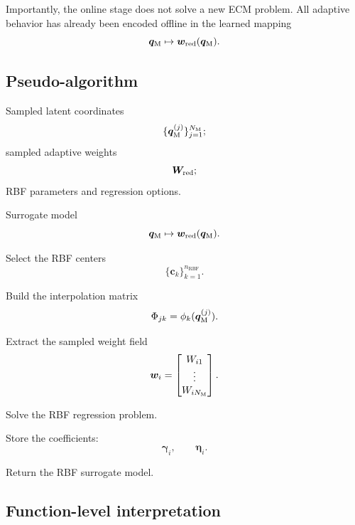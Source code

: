 \documentclass[11pt,a4paper]{article}
\begin{document}
Importantly, the online stage does not solve a new ECM problem. All adaptive
behavior has already been encoded offline in the learned mapping
\[
        \bm q_{\mathrm{M}}\mapsto\bm w_{\mathrm{red}}(\bm q_{\mathrm{M}}).
\]

\subsection{Pseudo-algorithm}

\begin{algorithm}[H]
\caption{Regression of the adaptive weight fields}
\label{alg:weight_regression}
\begin{algorithmic}[1]

\Require
Sampled latent coordinates
\[
        \{\bm q_{\mathrm{M}}^{(j)}\}_{j=1}^{N_{\mathrm{M}}};
\]
sampled adaptive weights
\[
        \bm W_{\mathrm{red}};
\]
RBF parameters and regression options.

\Ensure
Surrogate model
\[
        \bm q_{\mathrm{M}}\mapsto\bm w_{\mathrm{red}}(\bm q_{\mathrm{M}}).
\]

\State Select the RBF centers
\[
        \{
        \bm c_k
        \}_{k=1}^{n_{\mathrm{RBF}}}.
\]

\State Build the interpolation matrix
\[
        \Phi_{jk}=\phi_k(\bm q_{\mathrm{M}}^{(j)}).
\]


    \State Extract the sampled weight field
    \[
        \bm w_i=
        \begin{bmatrix}
        W_{i1}\\
        \vdots\\
        W_{iN_{\mathrm{M}}}
        \end{bmatrix}.
    \]

    \State Solve the RBF regression problem.

    \State Store the coefficients:
    \[
        \bm\gamma_i,
        \qquad
        \bm\eta_i.
    \]

\EndFor

\State Return the RBF surrogate model.

\end{algorithmic}
\end{algorithm}

\subsection{Function-level interpretation}
\end{document}
